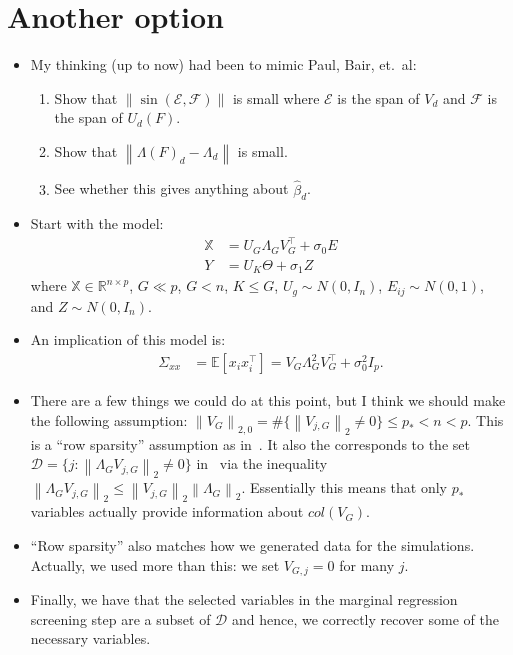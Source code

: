 \documentclass[11pt]{article}
\newcommand{\norm}[1]{\left\lVert #1 \right\rVert}
\newcommand{\X}{\mathbb{X}}
\newcommand{\R}{\mathbb{R}}
\newcommand{\Expect}[1]{\mathbb{E}\left[ #1 \right]}
\begin{document}
\section{Another option}
\begin{itemize}
\item My thinking (up to now) had been to mimic Paul, Bair, et.\ al:
  \begin{enumerate}
  \item Show that $\norm{\sin(\mathcal{E},\mathcal{F})}$ is small
    where $\mathcal{E}$ is the span of $V_d$ and $\mathcal{F}$ is the
    span of $U_d(F)$.
  \item Show that $\norm{\Lambda(F)_d-\Lambda_d}$ is small.
  \item See whether this gives anything about $\hat{\beta}_d$.
  \end{enumerate}
\item Start with the model:
  \begin{align}
    \X &= U_G \Lambda_G V_G^\top + \sigma_0 E\\
    Y &= U_K\Theta + \sigma_1 Z
  \end{align}
  where $\X \in \R^{n\times p}$, $G \ll p$, $G <n$, $K\leq G$,
  $U_g\sim N(0,I_n)$, $E_{ij} \sim N(0,1)$, and $Z \sim N(0,I_n)$.
\item An implication of this model is:
  \begin{align}
  \Sigma_{xx} &= \Expect{x_i x_i^\top} = V_G\Lambda_G^2V^\top_G +
                \sigma_0^2 I_p.
  \end{align}
\item There are a few things we could do at this point, but I think we
  should make the following assumption:
  $\norm{V_G}_{2,0}=\#\{\norm{V_{j,G}}_2\neq 0\} \leq p_*
  <n<p$. This is a ``row sparsity'' assumption as
  in~\citet{VuLei2013}. It also the corresponds to the set
  $\mathcal{D} = \{j:\norm{\Lambda_GV_{j,G}}_2\neq 0\}$
  in~\citet{paul2008preconditioning} via the inequality
  $\norm{\Lambda_GV_{j,G}}_2 \leq
  \norm{V_{j,G}}_2\norm{\Lambda_G}_2$. Essentially this means that
  only $p_*$ variables actually provide information about $col(V_G)$.
\item ``Row sparsity'' also matches how we generated data for the
  simulations. Actually, we used more than this: we set $V_{G,j}=0$ for many $j$.
\item Finally, we have that the selected variables in the marginal
  regression screening step are a subset of $\mathcal{D}$ and hence,
  we correctly recover some of the necessary variables.

\end{itemize}
\end{document}

